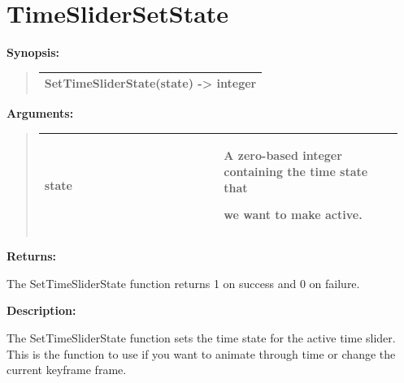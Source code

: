\documentclass[letterpaper,10pt,english]{sphinxmanual}
\begin{document}
\section{TimeSliderSetState}
\label{functions:timeslidersetstate}
\begin{DUlineblock}{0em}
\item[] \textbf{Synopsis:}
\end{DUlineblock}
\begin{quote}

\begin{tabulary}{\linewidth}{|L|}
\hline

SetTimeSliderState(state) -\textgreater{} integer
\\
\hline\end{tabulary}

\end{quote}

\begin{DUlineblock}{0em}
\item[] 
\item[] \textbf{Arguments:}
\end{DUlineblock}
\begin{quote}

\begin{tabular}{|p{0.475\linewidth}|p{0.475\linewidth}|}
\hline

state
 & 
\begin{DUlineblock}{0em}
\item[] A zero-based integer containing the time state that
\item[] we want to make active.
\end{DUlineblock}
\\
\hline\end{tabular}

\end{quote}

\begin{DUlineblock}{0em}
\item[] 
\item[] \textbf{Returns:}
\item[] The SetTimeSliderState function returns 1 on success and 0 on failure.
\item[] 
\item[] \textbf{Description:}
\item[] The SetTimeSliderState function sets the time state for the active time
slider. This is the function to use if you want to animate through time or
change the current keyframe frame.
\end{DUlineblock}
\end{document}
